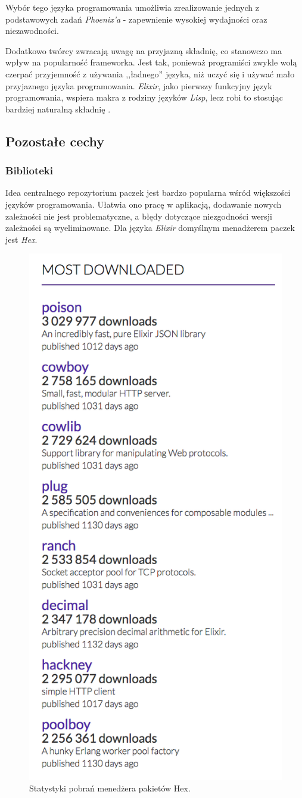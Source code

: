 Wybór tego języka programowania umożliwia zrealizowanie jednych z podstawowych zadań \textit{Phoenix'a} - zapewnienie wysokiej wydajności oraz niezawodności.

Dodatkowo twórcy zwracają uwagę na przyjazną składnię, co stanowczo ma wpływ na popularność frameworka. Jest tak, ponieważ programiści zwykle wolą czerpać przyjemność z używania ,,ładnego'' języka, niż uczyć się i używać mało przyjaznego języka programowania. \textit{Elixir}, jako pierwszy funkcyjny język programowania, wspiera makra z rodziny języków \textit{Lisp}, lecz robi to stosując bardziej naturalną składnię \cite{phoenix_doctrine}.

\subsection{Pozostałe cechy}
\subsubsection{Biblioteki}
Idea centralnego repozytorium paczek jest bardzo popularna wśród większości języków programowania. Ułatwia ono pracę w aplikacją, dodawanie nowych zależności nie jest problematyczne, a błędy dotyczące niezgodności wersji zależności są wyeliminowane. Dla języka \textit{Elixir} domyślnym menadżerem paczek jest \textit{Hex}.

\begin{figure}[h]
  \centering
  \includegraphics[width=.4\linewidth]{images/hex_stats}
  \caption{Statystyki pobrań menedżera pakietów Hex.}
  \label{fig:hex_stats}
\end{figure}

